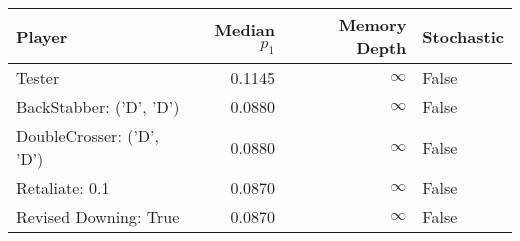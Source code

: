 \begin{tabular}{lrrl}
\toprule
                    Player &  Median $p_1$ &  Memory Depth & Stochastic \\
\midrule
                    Tester &        0.1145 &            \(\infty\) &      False \\
   BackStabber: ('D', 'D') &        0.0880 &            \(\infty\) &      False \\
 DoubleCrosser: ('D', 'D') &        0.0880 &            \(\infty\) &      False \\
            Retaliate: 0.1 &        0.0870 &            \(\infty\) &      False \\
     Revised Downing: True &        0.0870 &            \(\infty\) &      False \\
\bottomrule
\end{tabular}
